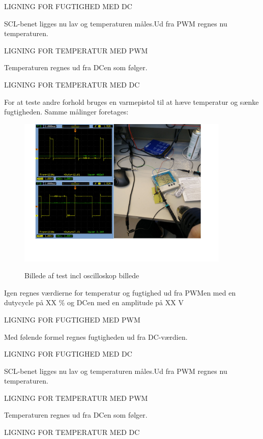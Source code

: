LIGNING FOR FUGTIGHED MED DC

SCL-benet ligges nu lav og temperaturen måles.Ud fra PWM regnes nu temperaturen.

LIGNING FOR TEMPERATUR MED PWM

Temperaturen regnes ud fra DCen som følger. 

LIGNING FOR TEMPERATUR MED DC


For at teste andre forhold bruges en varmepistol til at hæve temperatur og sænke fugtigheden. 
Samme målinger foretages:

\begin{figure}[h]
\centering
{\includegraphics[width=0.90\textwidth]{filer/modultest/Billeder/test_varmt}}
\caption{Billede af test incl oscilloskop billede}
\label{lab:test_varmt}
\end{figure}

Igen regnes værdierne for temperatur og fugtighed ud fra PWMen med en dutycycle på XX \% og DCen med en amplitude på XX V


LIGNING FOR FUGTIGHED MED PWM

Med følende formel regnes fugtigheden ud fra DC-værdien.

LIGNING FOR FUGTIGHED MED DC

SCL-benet ligges nu lav og temperaturen måles.Ud fra PWM regnes nu temperaturen.

LIGNING FOR TEMPERATUR MED PWM

Temperaturen regnes ud fra DCen som følger. 

LIGNING FOR TEMPERATUR MED DC

